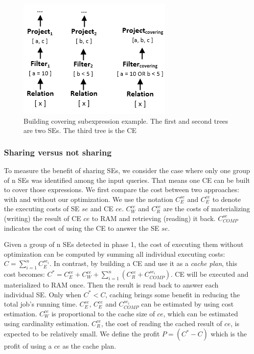 \begin{figure}[!htb]
	\centering
	\includegraphics[scale=0.75]{figures/covering}
	\caption{Building covering subexpression example. The first and second trees are two SEs. The third tree is the CE}
	\label{fig:covering}
\end{figure}

\subsubsection{Sharing versus not sharing}
\label{sec:sharing-vs-notsharing}
To measure the benefit of sharing SEs, we consider the case where only one group of n SEs was identified among the input queries. That means one CE can be built to cover those expressions. We first compare the cost between two approaches: with and without our optimization. We use the notation $C_{E}^{se}$ and $C_{E}^{ce}$ to denote the executing costs of SE $se$ and CE $ce$. $C_{W}^{ce}$ and $C_{R}^{ce}$ are the costs of materializing (writing) the result of CE $ce$ to RAM and retrieving (reading) it back. $C_{COMP}^{se}$ indicates the cost of using the CE to answer the SE $se$.

Given a group of n SEs detected in phase 1, the cost of executing them without optimization can be computed by summing all individual executing costs: $C = \sum_{i=1}^{n}C_{E}^{se_i}$. In contrast, by building a CE and use it as a \emph{cache plan}, this cost becomes: 
$C^* = C_{E}^{ce} + C_{W}^{ce} + \sum _{i=1}^{n}(C_{R}^{ce} + C_{COMP}^{se_i})$. 
CE will be executed and materialized to RAM once. Then the result is read back to answer each individual SE. Only when $C^* < C$, caching brings some benefit in reducing the total job's running time. $C_{E}^{se}$, $C_{E}^{ce}$ and $C_{COMP}^{se_i}$ can be estimated by using cost estimation. $C_{W}^{ce}$ is proportional to the cache size of $ce$, which can be estimated using cardinality estimation. $C_{R}^{ce}$, the cost of reading the cached result of $ce$, is expected to be relatively small. We define the profit $P = (C^*-C)$ which is the profit of using a $ce$ as the cache plan.

